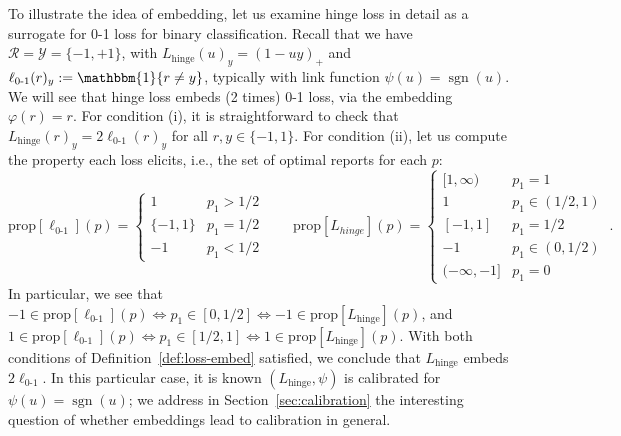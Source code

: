 \documentclass[12pt]{article}
\newcommand{\prop}[1]{\mathrm{prop}[#1]}
\newcommand{\simplex}{\Delta_\Y}
\newcommand{\R}{\mathcal{R}}
\newcommand{\Y}{\mathcal{Y}}
\newcommand{\inprod}[2]{\langle #1, #2 \rangle}%
\newcommand{\ones}{\mathbbm{1}}
\newcommand{\Ind}[1]{\ones\{#1\}}
\newcommand{\hinge}{L_{\mathrm{hinge}}}
\newcommand{\ellzo}{\ell_{\text{0-1}}}
\DeclareMathOperator*{\sgn}{sgn}
\begin{document}
To illustrate the idea of embedding, let us examine hinge loss in detail as a surrogate for 0-1 loss for binary classification.
Recall that we have $\R = \Y = \{-1, +1\}$, with $\hinge(u)_y = (1 - uy)_+$ and $\ellzo(r)_y := \Ind{r\neq y}$, typically with link function $\psi(u) = \sgn(u)$.
We will see that hinge loss embeds (2 times) 0-1 loss, via the embedding $\varphi(r) = r$.
For condition (i), it is straightforward to check that $\hinge(r)_y = 2\ellzo(r)_y$ for all $r,y\in\{-1,1\}$.
For condition (ii), let us compute the property each loss elicits, i.e., the set of optimal reports for each $p$:
\[
\prop{\ellzo}(p) = \begin{cases}
1 & p_1 > 1/2 \\
\{-1,1\} & p_1 = 1/2\\
-1 & p_1 < 1/2
\end{cases}
\qquad
\prop{L_{hinge}}(p) = \begin{cases}
[1,\infty) & p_1 = 1\\
1 & p_1 \in (1/2,1) \\
[-1,1] & p_1 = 1/2\\
-1& p_1 \in (0, 1/2)\\
(-\infty, -1]& p_1 = 0
\end{cases}~.
\]
In particular, we see that $-1 \in \prop{\ellzo}(p) \iff p_1 \in [0, 1/2] \iff -1 \in \prop{\hinge}(p)$, and $1 \in \prop{\ellzo}(p) \iff p_1 \in [1/2,1] \iff 1 \in \prop{\hinge}(p)$.
With both conditions of Definition~\ref{def:loss-embed} satisfied, we conclude that $\hinge$ embeds $2\ellzo$.
In this particular case, it is known $(\hinge,\psi)$ is calibrated for $\psi(u) = \sgn(u)$; we address in Section~\ref{sec:calibration} the interesting question of whether embeddings lead to calibration in general.

\end{document}
